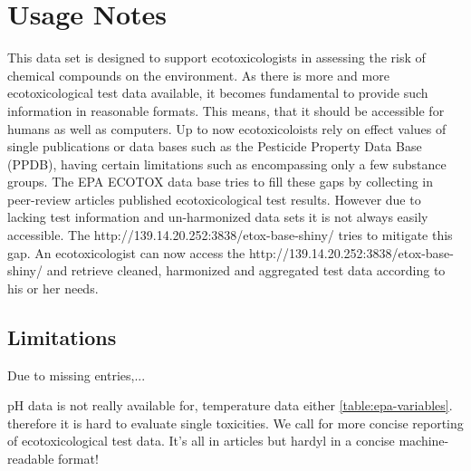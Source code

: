 \documentclass[english]{article}
\newcommand{\epa}{EPA ECOTOX data base}
\newcommand{\app}{http://139.14.20.252:3838/etox-base-shiny/}
\begin{document}
\section*{Usage Notes}
This data set is designed to support ecotoxicologists in assessing the risk of chemical compounds on the environment. As there is more and more ecotoxicological test data available, it becomes fundamental to provide such information in reasonable formats. This means, that it should be accessible for humans as well as computers. Up to now ecotoxicoloists rely on effect values of single publications or data bases such as the Pesticide Property Data Base (PPDB), having certain limitations such as encompassing only a few substance groups. The \epa{} tries to fill these gaps by collecting in peer-review articles published ecotoxicological test results. However due to lacking test information and un-harmonized data sets it is not always easily accessible. The \app{} tries to mitigate this gap. An ecotoxicologist can now access the \app{} and retrieve cleaned, harmonized and aggregated test data according to his or her needs.

\subsection*{Limitations}
Due to missing entries,... 

pH data is not really available for, temperature data either \ref{table:epa-variables}. therefore it is hard to evaluate single toxicities. We call for more concise reporting of ecotoxicological test data. It's all in articles but hardyl in a concise machine-readable format!
\end{document}

